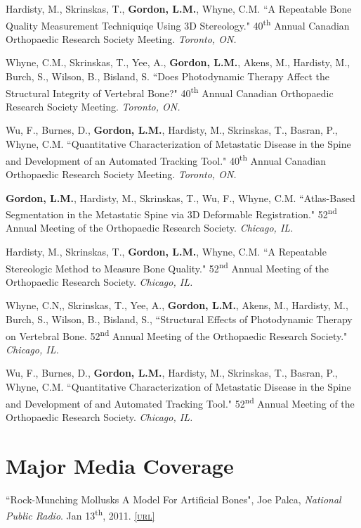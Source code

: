 Hardisty, M., Skrinskas, T., \textbf{Gordon, L.M.}, Whyne, C.M. ``A Repeatable Bone Quality Measurement Techniquiqe Using 3D Stereology." 40\textsuperscript{th} Annual Canadian Orthopaedic Research Society Meeting. \emph{Toronto, ON.}

Whyne, C.M., Skrinskas, T., Yee, A., \textbf{Gordon, L.M.}, Akens, M., Hardisty, M., Burch, S., Wilson, B., Bisland, S. ``Does Photodynamic Therapy Affect the Structural Integrity of Vertebral Bone?" 40\textsuperscript{th} Annual Canadian Orthopaedic Research Society  Meeting. \emph{Toronto, ON.}

Wu, F., Burnes, D., \textbf{Gordon, L.M.}, Hardisty, M., Skrinskas, T., Basran, P., Whyne, C.M. ``Quantitative Characterization of Metastatic Disease in the Spine and Development of an Automated Tracking Tool." 40\textsuperscript{th} Annual Canadian Orthopaedic Research Society Meeting. \emph{Toronto, ON.}

\textbf{Gordon, L.M.}, Hardisty, M., Skrinskas, T., Wu, F., Whyne, C.M. ``Atlas-Based Segmentation in the Metastatic Spine via 3D Deformable Registration." 52\textsuperscript{nd} Annual Meeting of the Orthopaedic Research Society. \emph{Chicago, IL.}

Hardisty, M., Skrinskas, T., \textbf{Gordon, L.M.}, Whyne, C.M. ``A Repeatable Stereologic Method to Measure Bone Quality." 52\textsuperscript{nd} Annual Meeting of the Orthopaedic Research Society. \emph{Chicago, IL.}

Whyne, C.N,, Skrinskas, T., Yee, A., \textbf{Gordon, L.M.}, Akens, M., Hardisty, M., Burch, S., Wilson, B., Bisland, S., ``Structural Effects of Photodynamic Therapy on Vertebral Bone. 52\textsuperscript{nd} Annual Meeting of the Orthopaedic Research Society." \emph{Chicago, IL.}

Wu, F., Burnes, D., \textbf{Gordon, L.M.}, Hardisty, M., Skrinskas, T., Basran, P., Whyne, C.M. ``Quantitative Characterization of Metastatic Disease in the Spine and Development of and Automated Tracking Tool." 52\textsuperscript{nd} Annual Meeting of the Orthopaedic Research Society. \emph{Chicago, IL.}
\endgroup

\section*{Major Media Coverage}
``Rock-Munching Mollusks A Model For Artificial Bones", Joe Palca, \emph{National Public Radio}. Jan 13\textsuperscript{th}, 2011. \href{http://www.npr.org/2011/01/13/132859853/rock-munching-mollusks-a-model-for-artificial-bones}{\textsc{\footnotesize{[url]}}}

